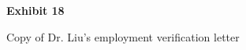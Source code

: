 \documentclass{article}
\begin{document}


\vspace*{\fill}

\begin{center}

{\LARGE \bf
Exhibit 18
}

\vspace{10\baselineskip}

{\large Copy of Dr. Liu’s employment verification letter}

\end{center}
\vspace*{\fill}



\vspace*{\fill}
\end{document}
